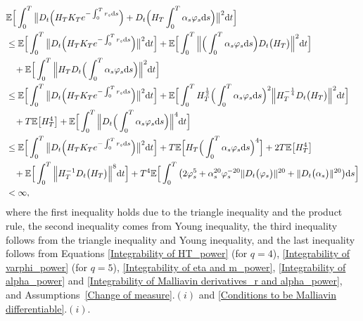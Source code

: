 \documentclass[12,reqno]{amsart}
\numberwithin{equation}{section}
\begin{document}
\begin{align}\label{E5_Proposition 4.1}
	&\mathbb{E}\Big[\int_{0}^{T}\big\|D_{t}\Big(H_{T}K_{T}e^{-\int_{0}^{T}r_{s}\mathrm{d}s}\Big)+D_{t}\Big(H_{T}\int_{0}^{T}\alpha_{s} \varphi_{s}\mathrm{d}s\Big)\big\|^{2}\mathrm{d}t\Big]\notag\\
	&\le\mathbb{E}\Big[\int_{0}^{T}\big\|D_{t}\Big(H_{T}K_{T}e^{-\int_{0}^{T}r_{s}\mathrm{d}s}\Big)\big\|^{2}\mathrm{d}t\Big]+\mathbb{E}\Big[\int_{0}^{T}\Big\|\Big(\int_{0}^{T}\alpha_{s}\varphi_{s}\mathrm{d}s\Big)D_{t}\big(H_{T}\big)\Big\|^{2}\mathrm{d}t\Big]\notag\\
	&\phantom{X}+\mathbb{E}\Big[\int_{0}^{T}\Big\|H_{T}D_{t}\Big(\int_{0}^{T}\alpha_{s}\varphi_{s}\mathrm{d}s\Big)\Big\|^{2}\mathrm{d}t\Big]\notag\\
	&\le\mathbb{E}\Big[\int_{0}^{T}\big\|D_{t}\Big(H_{T}K_{T}e^{-\int_{0}^{T}r_{s}\mathrm{d}s}\Big)\big\|^{2}\mathrm{d}t\Big]+\mathbb{E}\Big[\int_{0}^{T}H_{T}^{\frac{1}{2}}\Big(\int_{0}^{T}\alpha_{s}\varphi_{s}\mathrm{d}s\Big)^{2}\Big\|H_{T}^{-\frac{1}{4}}D_{t}\big(H_{T}\big)\Big\|^{2}\mathrm{d}t\Big]\notag\\
	&\phantom{X}+T\mathbb{E}\big[H_{T}^{4}\big]+\mathbb{E}\Big[\int_{0}^{T}\Big\|D_{t}\Big(\int_{0}^{T}\alpha_{s}\varphi_{s}\mathrm{d}s\Big)\Big\|^{4}\mathrm{d}t\Big]\notag\\
	&\le\mathbb{E}\Big[\int_{0}^{T}\big\|D_{t}\Big(H_{T}K_{T}e^{-\int_{0}^{T}r_{s}\mathrm{d}s}\Big)\big\|^{2}\mathrm{d}t\Big]+T\mathbb{E}\Big[H_{T}\Big(\int_{0}^{T}\alpha_{s}\varphi_{s}\mathrm{d}s\Big)^{4}\Big]+2T\mathbb{E}\big[H_{T}^{4}\big]\notag\\
	&\phantom{X}+\mathbb{E}\Big[\int_{0}^{T}\Big\|H_{T}^{-1}D_{t}\big(H_{T}\big)\Big\|^{8}\mathrm{d}t\Big]+T^{4}\mathbb{E}\Big[\int_{0}^{T}\big(2\varphi_{s}^{5}+\alpha_{s}^{20}\varphi_{s}^{-20}\|D_{t}\big(\varphi_{s}\big)\|^{20}+\|D_{t}\big(\alpha_{s}\big)\|^{20}\big)\mathrm{d}s\Big]\notag\\
	&<\infty,
\end{align}
where the first inequality holds due to the triangle inequality and the product rule, the second inequality comes from Young inequality, the third inequality follows from the triangle inequality and Young inequality, and the last inequality follows from Equations \eqref{Integrability of HT_power} (for $q=4$), \eqref{Integrability of varphi_power} (for $q=5$), \eqref{Integrability of eta and m_power}, \eqref{Integrability of alpha_power} and \eqref{Integrability of Malliavin derivatives_r and alpha_power}, and Assumptions~\ref{Change of measure}$.(i)$ and \ref{Conditions to be Malliavin differentiable}$.(i)$.
\end{document}
